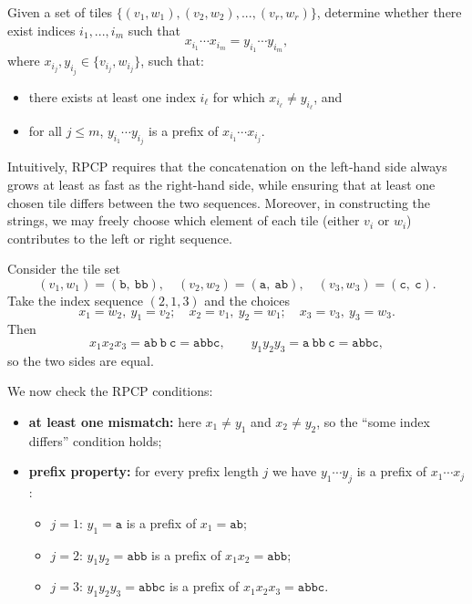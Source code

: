 \begin{definition}
	Given a set of tiles $\{(v_1, w_1), (v_2, w_2), ..., (v_r, w_r)\}$, 
	determine whether there exist indices $i_1, ..., i_m$ such that
	$$x_{i_1}\cdots x_{i_m} = y_{i_1}\cdots y_{i_m},$$
	where $x_{i_j}, y_{i_j} \in \{v_{i_j}, w_{i_j}\}$, such that:
	\begin{itemize}
		\item there exists at least one index $i_\ell$ for which $x_{i_\ell}\neq y_{i_\ell}$, and
		\item for all $j \leq m$, $y_{i_1}\cdots y_{i_j}$ is a prefix of $x_{i_1}\cdots x_{i_j}$.
	\end{itemize}
\end{definition}

Intuitively, RPCP requires that the concatenation on the left-hand side always 
grows at least as fast as the right-hand side, while ensuring that at least one 
chosen tile differs between the two sequences. Moreover, in constructing the 
strings, we may freely choose which element of each tile (either $v_i$ or $w_i$) 
contributes to the left or right sequence.

\bigskip

\begin{example}\label{exmp:rpcp}
Consider the tile set
\[
(v_1,w_1)=(\texttt{b},\ \texttt{bb}),\quad
(v_2,w_2)=(\texttt{a},\ \texttt{ab}),\quad
(v_3,w_3)=(\texttt{c},\ \texttt{c}).
\]
Take the index sequence $(2,1,3)$ and the choices
\[
x_1 = w_2,\ y_1 = v_2;\quad
x_2 = v_1,\ y_2 = w_1;\quad
x_3 = v_3,\ y_3 = w_3.
\]
Then
\[
x_1 x_2 x_3 = \texttt{ab}\ \texttt{b}\ \texttt{c} = \texttt{abbc},
\qquad
y_1 y_2 y_3 = \texttt{a}\ \texttt{bb}\ \texttt{c} = \texttt{abbc},
\]
so the two sides are equal.

We now check the RPCP conditions:
\begin{itemize}
  \item \textbf{at least one mismatch:} here $x_1\neq y_1$ and
        $x_2\neq y_2$, so the ``some index differs'' condition holds;
  \item \textbf{prefix property:} for every prefix length $j$ we have
        $y_{1}\cdots y_{j}$ is a prefix of $x_{1}\cdots x_{j}$:
        \begin{itemize}
          \item $j=1$: $y_1=\texttt{a}$ is a prefix of $x_1=\texttt{ab}$;
          \item $j=2$: $y_1y_2=\texttt{abb}$ is a prefix of $x_1x_2=\texttt{abb}$;
          \item $j=3$: $y_1y_2y_3=\texttt{abbc}$ is a prefix of $x_1x_2x_3=\texttt{abbc}$.
        \end{itemize}
\end{itemize}
\end{example}

